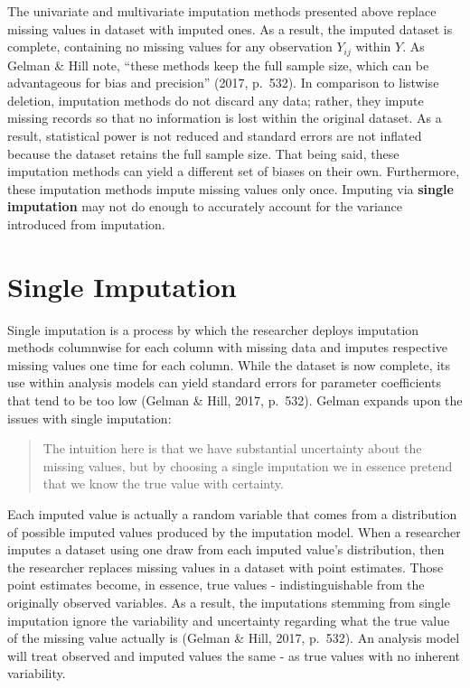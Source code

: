 \documentclass[12pt,oneside]{chicagocapstone}
\begin{document}
The univariate and multivariate imputation methods presented above
replace missing values in dataset with imputed ones. As a result, the
imputed dataset is complete, containing no missing values for any
observation \(Y_{ij}\) within \(Y\). As Gelman \& Hill note, ``these
methods keep the full sample size, which can be advantageous for bias
and precision'' (2017, p.~532). In comparison to listwise deletion,
imputation methods do not discard any data; rather, they impute missing
records so that no information is lost within the original dataset. As a
result, statistical power is not reduced and standard errors are not
inflated because the dataset retains the full sample size. That being
said, these imputation methods can yield a different set of biases on
their own. Furthermore, these imputation methods impute missing values
only once. Imputing via \textbf{single imputation} may not do enough to
accurately account for the variance introduced from imputation.

\hypertarget{background-single-imputation}{\section*{Single
Imputation}\label{background-single-imputation}}

Single imputation is a process by which the researcher deploys
imputation methods columnwise for each column with missing data and
imputes respective missing values one time for each column. While the
dataset is now complete, its use within analysis models can yield
standard errors for parameter coefficients that tend to be too low
(Gelman \& Hill, 2017, p.~532). Gelman expands upon the issues with
single imputation:
\begin{quote}
The intuition here is that we have substantial uncertainty about the
missing values, but by choosing a single imputation we in essence
pretend that we know the true value with certainty.
\end{quote}
Each imputed value is actually a random variable that comes from a
distribution of possible imputed values produced by the imputation
model. When a researcher imputes a dataset using one draw from each
imputed value's distribution, then the researcher replaces missing
values in a dataset with point estimates. Those point estimates become,
in essence, true values - indistinguishable from the originally observed
variables. As a result, the imputations stemming from single imputation
ignore the variability and uncertainty regarding what the true value of
the missing value actually is (Gelman \& Hill, 2017, p.~532). An
analysis model will treat observed and imputed values the same - as true
values with no inherent variability.
\end{document}

